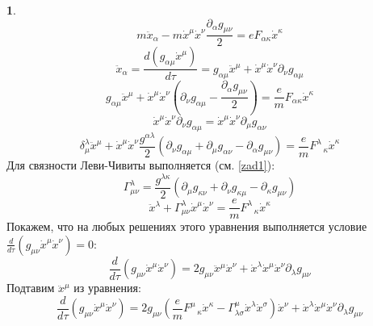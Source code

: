 \documentclass[12pt]{article}
\theoremstyle{definition}
\newtheorem{zad}{}[section]
\begin{document}
\begin{zad}
\begin{equation}
\end{equation}
\begin{equation}
    m\ddot{x}_\alpha-m\dot{x}^\mu\dot{x}^\nu\frac{\partial_\alpha g_{\mu\nu}}{2}=eF_{\alpha\kappa}\dot{x}^\kappa
\end{equation}
\begin{equation}
    \ddot{x}_\alpha=\frac{d(g_{\alpha\mu}\dot{x}^\mu)}{d\tau}=g_{\alpha\mu}\ddot{x}^\mu+\dot{x}^\mu\dot{x}^\nu\partial_\nu g_{\alpha\mu}
\end{equation}
\begin{equation}
    g_{\alpha\mu}\ddot{x}^\mu+\dot{x}^\mu\dot{x}^\nu \left(\partial_\nu g_{\alpha\mu}-\frac{\partial_\alpha g_{\mu\nu}}{2}\right)=\frac{e}{m}F_{\alpha\kappa}\dot{x}^\kappa
\end{equation}
\begin{equation}
    \dot{x}^\mu\dot{x}^\nu\partial_\nu g_{\alpha\mu}=\dot{x}^\mu\dot{x}^\nu\partial_\mu g_{\alpha\nu}
\end{equation}
\begin{equation}
    \delta^\lambda_\mu\ddot{x}^\mu+\dot{x}^\mu\dot{x}^\nu\frac{g^{\alpha\lambda}}{2}(\partial_\nu g_{\alpha\mu}+\partial_\mu g_{\alpha\nu}-\partial_\alpha g_{\mu\nu})=\frac{e}{m}F^\lambda_{\;\;\;\kappa}\dot{x}^\kappa
\end{equation}
Для связности Леви-Чивиты выполняется (см. \ref{zad1}):
\begin{equation}
    \Gamma^\lambda_{\mu\nu}=\frac{g^{\lambda\kappa}}{2}(\partial_\mu g_{\kappa\nu}+\partial_\nu g_{\kappa\mu}-\partial_\kappa g_{\mu\nu})
\end{equation}
\begin{equation}
    \boxed{\ddot{x}^\lambda+\Gamma^\lambda_{\mu\nu}\dot{x}^\mu\dot{x}^\nu=\frac{e}{m}F^\lambda_{\;\;\;\kappa}\dot{x}^\kappa}
\end{equation}
Покажем, что на любых решениях этого уравнения выполняется условие $\frac{d}{d\tau}(g_{\mu\nu}\dot{x}^\mu\dot{x}^\nu)=0$:
\begin{equation}
    \frac{d}{d\tau}(g_{\mu\nu}\dot{x}^\mu\dot{x}^\nu)=2g_{\mu\nu}\ddot{x}^\mu\dot{x}^\nu+\dot{x}^\lambda\dot{x}^\mu\dot{x}^\nu\partial_\lambda g_{\mu\nu}
\end{equation}
Подтавим $\ddot{x}^\mu$ из уравнения:
\begin{equation}
    \frac{d}{d\tau}(g_{\mu\nu}\dot{x}^\mu\dot{x}^\nu)=2g_{\mu\nu}\left(\frac{e}{m}F^\mu_{\;\;\;\kappa}\dot{x}^\kappa-\Gamma^\mu_{\lambda\sigma}\dot{x}^\lambda\dot{x}^\sigma\right)\dot{x}^\nu+\dot{x}^\lambda\dot{x}^\mu\dot{x}^\nu\partial_\lambda g_{\mu\nu}

\end{equation}
\end{zad}
\end{document}
